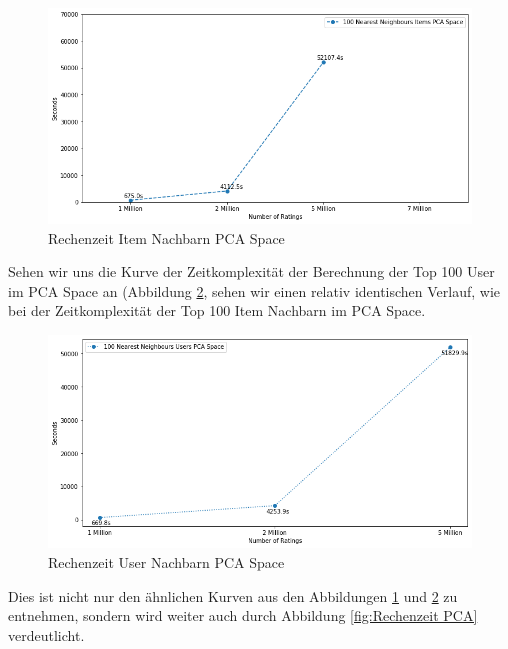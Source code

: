 \begin{figure}[h!tb]
	\centering
	\includegraphics[keepaspectratio,width=\linewidth]{img/Time to Compute Items PCA.png} 
	\caption{Rechenzeit Item Nachbarn PCA Space}
	\label{fig:Rechenzeit Items PCA}
\end{figure}


Sehen wir uns die Kurve der Zeitkomplexität der Berechnung der Top 100 User im PCA Space an (Abbildung \ref{fig:Rechenzeit User PCA}, sehen wir einen relativ identischen Verlauf, wie bei der Zeitkomplexität der Top 100 Item Nachbarn im PCA Space. 

\begin{figure}[h!tb]
	\centering
	\includegraphics[keepaspectratio,width=\linewidth]{img/Time to Compute User PCA.png} 
	\caption{Rechenzeit User Nachbarn PCA Space}
	\label{fig:Rechenzeit User PCA}
\end{figure}

Dies ist nicht nur den ähnlichen Kurven aus den Abbildungen \ref{fig:Rechenzeit Items PCA} und \ref{fig:Rechenzeit User PCA} zu entnehmen, sondern wird weiter auch durch Abbildung \ref{fig:Rechenzeit PCA} verdeutlicht.

